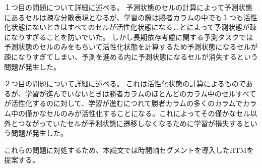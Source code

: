 １つ目の問題について詳細に述べる。
予測状態のセルの計算によって予測状態にあるセルは疎な分散表現となるが、学習の際は勝者カラムの中でも１つも活性化状態にないときはすべてのセルが活性化状態になることによって予測状態が疎になりすぎることを防いでいた。
しかし長期依存考慮に関する予測タスクでは予測状態のセルのみをもちいて活性化状態を計算するため予測状態になるセルが疎になりすぎてしまい、予測を進める内に予測状態になるセルが消失するという問題が発生した。

２つ目の問題について詳細に述べる。
これは活性化状態の計算によるものであるが、学習が進んでいないときは勝者カラムのほとんどのカラム中のセルすべてが活性化するのに対して、学習が進むにつれて勝者カラムの多くのカラムでカラム中の僅かなセルのみが活性化することになる。これによってその僅かなセル以外とつながっていたセルが予測状態に遷移しなくなるために学習が損失するという問題が発生した。

これらの問題に対処するため、本論文では時間軸セグメントを導入したHTMを提案する。
